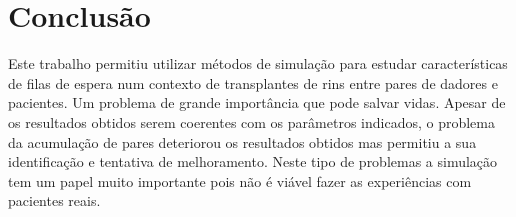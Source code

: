 \documentclass[10pt,a4paper,oneside]{article}
\begin{document}
\section*{Conclusão}

Este trabalho permitiu utilizar métodos de simulação para estudar
características de filas de espera num contexto de transplantes de
rins entre pares de dadores e pacientes. Um problema de grande importância
que pode salvar vidas. Apesar de os resultados obtidos serem coerentes
com os parâmetros indicados, o problema da acumulação de pares deteriorou
os resultados obtidos mas permitiu a sua identificação e tentativa de
melhoramento. Neste tipo de problemas a simulação tem um papel muito
importante pois não é viável fazer as experiências com pacientes reais.
\end{document}
